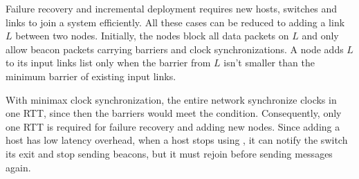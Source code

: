 {%


Failure recovery and incremental deployment requires new hosts, switches and links to join a \sys system efficiently.
All these cases can be reduced to adding a link $L$ between two nodes.
Initially, the nodes block all data packets on $L$ and only allow beacon packets carrying barriers and clock synchronizations.
A node adds $L$ to its input links list only when the barrier from $L$ isn't smaller than the minimum barrier of existing input links.

With minimax clock synchronization, the entire network synchronize clocks in one RTT, since then the barriers would meet the condition.
Consequently, only one RTT is required for failure recovery and adding new nodes.
Since adding a host has low latency overhead, when a host stops using \sys, it can notify the switch its exit and stop sending beacons, but it must rejoin before sending messages again.


\begin{table}
\centering
{}
\caption{
        Convergence time after failure and recovery of host and switch.
        Convergence time is the time since the event occurs until end-to-end delay recovers to normal.
    Convergence time 0 indicates not affected.
    $T_{timeout}$ is the beacon timeout for failure detection.
}
\label{tab:failure}
\end{table}

}
